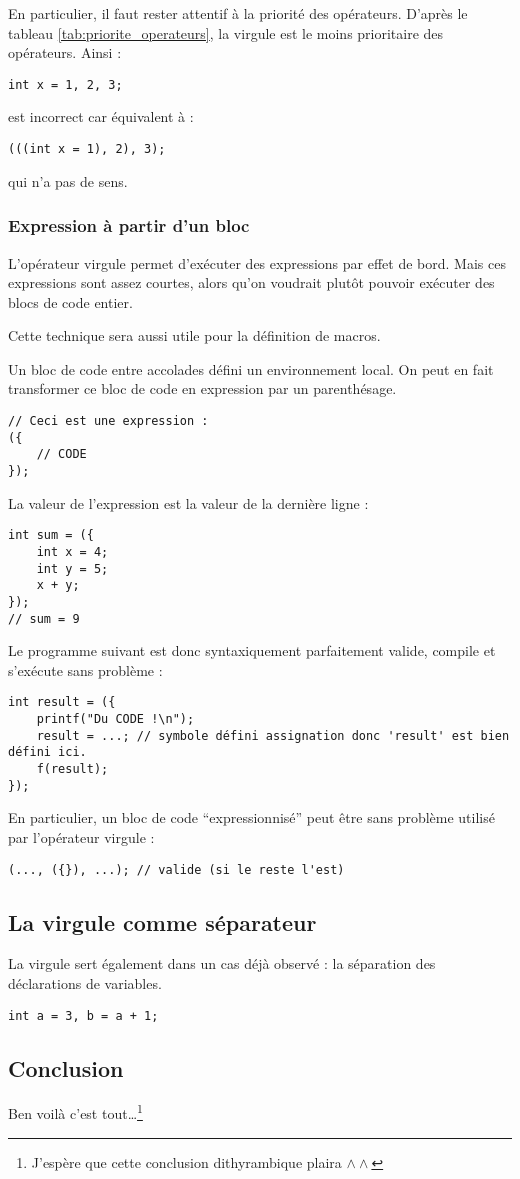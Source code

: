 \documentclass[../../../main.tex]{subfiles}
\begin{document}
En particulier, il faut rester attentif à la priorité des opérateurs. D'après le tableau \ref{tab:priorite_operateurs}, la virgule est le moins prioritaire des opérateurs. Ainsi :
\begin{verbatim}
int x = 1, 2, 3;
\end{verbatim}
est incorrect car équivalent à :
\begin{verbatim}
(((int x = 1), 2), 3);
\end{verbatim}
qui n’a pas de sens.
\subsubsection{Expression à partir d'un bloc}
L'opérateur virgule permet d'exécuter des expressions par effet de bord. Mais ces expressions sont assez courtes, alors qu'on voudrait plutôt pouvoir exécuter des blocs de code entier.

Cette technique sera aussi utile pour la définition de macros.

Un bloc de code entre accolades défini un environnement local. On peut en fait transformer ce bloc de code en expression par un parenthésage.
\begin{verbatim}
// Ceci est une expression :
({
	// CODE
});
\end{verbatim}
La valeur de l'expression est la valeur de la dernière ligne :
\begin{verbatim}
int sum = ({
	int x = 4;
	int y = 5;
	x + y;
});
// sum = 9
\end{verbatim}
Le programme suivant est donc syntaxiquement parfaitement valide, compile et s'exécute sans problème :
\begin{verbatim}
int result = ({
	printf("Du CODE !\n");
	result = ...; // symbole défini assignation donc 'result' est bien défini ici.
	f(result);
});
\end{verbatim}
En particulier, un bloc de code ``expressionnisé'' peut être sans problème utilisé par l'opérateur virgule :
\begin{verbatim}
(..., ({}), ...); // valide (si le reste l'est)
\end{verbatim}
\subsection{La virgule comme séparateur}
\label{sub:la_virgule_comme_s_parateur}
La virgule sert également dans un cas déjà observé : la séparation des déclarations de variables.
\begin{verbatim}
int a = 3, b = a + 1;
\end{verbatim}
\subsection{Conclusion}
\label{sub:conclusion}
Ben voilà c’est tout\dots\footnote{J'espère que cette conclusion dithyrambique plaira $\wedge\wedge$}
\end{document}
